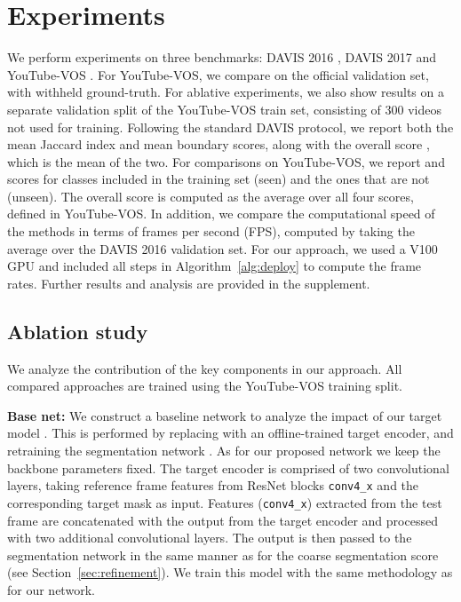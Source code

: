 \section{Experiments}

\newcommand{\mcJ}{\mathcal{J}}  \newcommand{\mcF}{\mathcal{F}}  \newcommand{\mcG}{\mathcal{G}} 
\newcommand{\mcJF}{\mathcal{J \& F}} 
We perform experiments on three benchmarks: DAVIS 2016 \cite{perazzi2016davis}, DAVIS 2017 \cite{perazzi2016davis} and YouTube-VOS \cite{xu2018youtube2}. For YouTube-VOS, we compare on the official validation set, with withheld ground-truth. For ablative experiments, we also show results on a separate validation split of the YouTube-VOS train set, consisting of 300 videos not used for training. Following the standard DAVIS protocol, we report both the mean Jaccard  index and mean boundary  scores, along with the overall score , which is the mean of the two. For comparisons on YouTube-VOS, we report  and  scores for classes included in the training set (seen) and the ones that are not (unseen). The overall score  is computed as the average over all four scores, defined in YouTube-VOS. 
In addition, we compare the computational speed of the methods in terms of frames per second (FPS), computed by taking the average over the DAVIS 2016 validation set. For our approach, we used a V100 GPU and included all steps in Algorithm~\ref{alg:deploy} to compute the frame rates. Further results and analysis are provided in the supplement. 

\subsection{Ablation study}  

We analyze the contribution of the key components in our approach. All compared approaches are trained using the YouTube-VOS training split.

\noindent\textbf{Base net:} We construct a baseline network to analyze the impact of our target model . This is performed by replacing  with an offline-trained target encoder, and retraining the segmentation network . As for our proposed network we keep the backbone  parameters fixed. The target encoder is comprised of two convolutional layers, taking reference frame features from ResNet blocks \verb|conv4_x| and the corresponding target mask as input. Features (\verb|conv4_x|) extracted from the test frame are concatenated with the output from the target encoder and processed with two additional convolutional layers. The output is then passed to the segmentation network  in the same manner as for the coarse segmentation score  (see Section~\ref{sec:refinement}). We train this model with the same methodology as for our network. 

